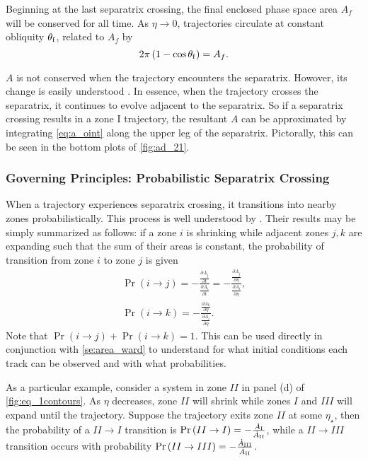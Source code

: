 \documentclass[
        fleqn,
        usenatbib,
        referee,
    ]{mnras}
\newcommand*{\pd}[2]{\frac{\partial#1}{\partial#2}}
\newcommand*{\p}[1]{\left(#1\right)}
\begin{document}
Beginning at the last separatrix crossing, the final enclosed phase space area
$A_f$ will be conserved for all time. As $\eta \to 0$, trajectories circulate at
constant obliquity $\theta_{\rm f}$, related to $A_f$ by
\begin{equation}
    2\pi\p{1 - \cos \theta_{\rm f}} = A_f. \label{eq:qfaf}
\end{equation}

$A$ is not conserved when the trajectory encounters the separatrix. Howover,
its change is easily understood \citep{henrard1982}. In essence, when the
trajectory crosses the separatrix, it continues to evolve adjacent to the
separatrix. So if a separatrix crossing results in a zone I trajectory, the
resultant $A$ can be approximated by integrating \autoref{eq:a_oint} along the
upper leg of the separatrix. Pictorally, this can be seen in the bottom plots of
\autoref{fig:ad_21}.

\subsubsection{Governing Principles: Probabilistic Separatrix Crossing}

When a trajectory experiences separatrix crossing, it transitions into nearby
zones probabilistically. This process is well understood by
\citealp{henrard1982,henrard1987}. Their results may be simply summarized as
follows: if a zone $i$ is shrinking while adjacent zones $j, k$ are expanding
such that the sum of their areas is constant, the probability of transition from
zone $i$ to zone $j$ is given
\begin{align}
    \Pr\p{i \to j} = -\frac{\pd{A_j}{t}}{ \pd{A_i}{t}}
        = -\frac{\pd{A_j}{\eta}}{ \pd{A_i}{\eta}},\\
    \Pr\p{i \to k}
        = -\frac{\pd{A_k}{\eta}}{ \pd{A_i}{\eta}}.\label{eq:henrard_hop}
\end{align}
Note that $\Pr \p{i \to j} + \Pr\p{i \to k} = 1$. This can be used directly in
conjunction with \autoref{se:area_ward} to understand for what initial
conditions each track can be observed and with what probabilities.

As a particular example, consider a system in zone $II$ in panel (d) of
\autoref{fig:eq_1contours}. As $\eta$ decreases, zone $II$ will shrink while
zones $I$ and $III$ will expand until the trajectory. Suppose the trajectory
exits zone $II$ at some $\eta_\star$, then the probability of a $II \to I$
transition is $\Pr\p{II \to I} = -\frac{\dot{A}_{\rm I}}{\dot{A}_{\rm II}}$,
while a $II \to III$ transition occurs with probability $\Pr\p{II \to III} =
-\frac{\dot{A}_{\rm III}}{\dot{A}_{\rm II}}$.
\end{document}
